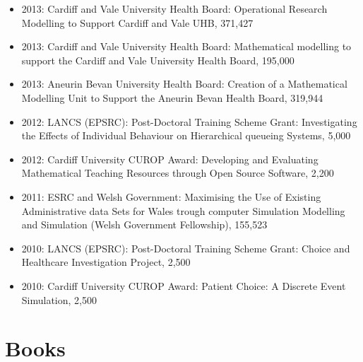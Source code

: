 \documentclass[10pt]{article}
\begin{document}
\begin{itemize}
  \item 2013: Cardiff and Vale University Health Board: Operational Research Modelling to Support Cardiff and Vale UHB, 371,427

  \item 2013: Cardiff and Vale University Health Board: Mathematical modelling to support the Cardiff and Vale University Health Board, 195,000

  \item 2013: Aneurin Bevan University Health Board: Creation of a Mathematical Modelling Unit to Support the Aneurin Bevan Health Board, 319,944

  \item 2012: LANCS (EPSRC): Post-Doctoral Training Scheme Grant: Investigating the Effects of Individual Behaviour on Hierarchical queueing Systems, 5,000

  \item 2012: Cardiff University CUROP Award: Developing and Evaluating Mathematical Teaching Resources through Open Source Software, 2,200

  \item 2011: ESRC and Welsh Government: Maximising the Use of Existing Administrative data Sets for Wales trough computer Simulation Modelling and Simulation (Welsh Government Fellowship), 155,523

  \item 2010: LANCS (EPSRC): Post-Doctoral Training Scheme Grant: Choice and Healthcare Investigation Project, 2,500

  \item 2010: Cardiff University CUROP Award: Patient Choice: A Discrete Event Simulation, 2,500

\end{itemize}

\section{Books}
\end{document}
